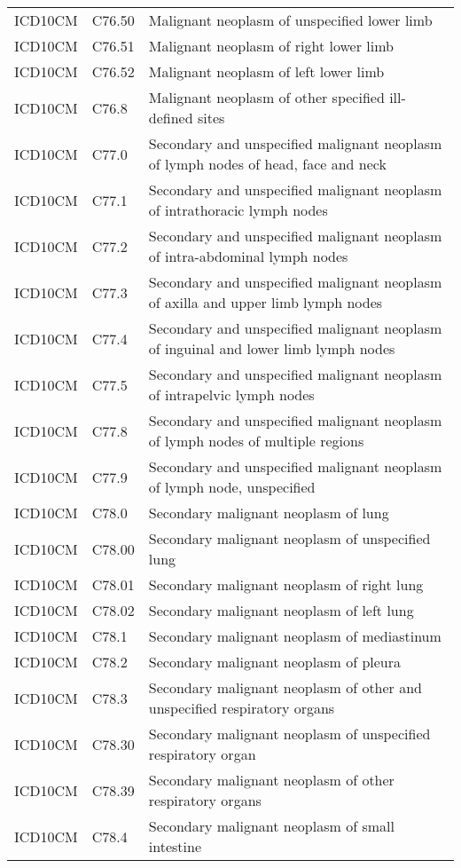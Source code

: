 \begin{table}[ht]
\begin{tabular}{lll}
  ICD10CM & C76.50 & Malignant neoplasm of unspecified lower limb \\ 
  ICD10CM & C76.51 & Malignant neoplasm of right lower limb \\ 
  ICD10CM & C76.52 & Malignant neoplasm of left lower limb \\ 
  ICD10CM & C76.8 & Malignant neoplasm of other specified ill-defined sites \\ 
  ICD10CM & C77.0 & Secondary and unspecified malignant neoplasm of lymph nodes of head, face and neck \\ 
  ICD10CM & C77.1 & Secondary and unspecified malignant neoplasm of intrathoracic lymph nodes \\ 
  ICD10CM & C77.2 & Secondary and unspecified malignant neoplasm of intra-abdominal lymph nodes \\ 
  ICD10CM & C77.3 & Secondary and unspecified malignant neoplasm of axilla and upper limb lymph nodes \\ 
  ICD10CM & C77.4 & Secondary and unspecified malignant neoplasm of inguinal and lower limb lymph nodes \\ 
  ICD10CM & C77.5 & Secondary and unspecified malignant neoplasm of intrapelvic lymph nodes \\ 
  ICD10CM & C77.8 & Secondary and unspecified malignant neoplasm of lymph nodes of multiple regions \\ 
  ICD10CM & C77.9 & Secondary and unspecified malignant neoplasm of lymph node, unspecified \\ 
  ICD10CM & C78.0 & Secondary malignant neoplasm of lung \\ 
  ICD10CM & C78.00 & Secondary malignant neoplasm of unspecified lung \\ 
  ICD10CM & C78.01 & Secondary malignant neoplasm of right lung \\ 
  ICD10CM & C78.02 & Secondary malignant neoplasm of left lung \\ 
  ICD10CM & C78.1 & Secondary malignant neoplasm of mediastinum \\ 
  ICD10CM & C78.2 & Secondary malignant neoplasm of pleura \\ 
  ICD10CM & C78.3 & Secondary malignant neoplasm of other and unspecified respiratory organs \\ 
  ICD10CM & C78.30 & Secondary malignant neoplasm of unspecified respiratory organ \\ 
  ICD10CM & C78.39 & Secondary malignant neoplasm of other respiratory organs \\ 
  ICD10CM & C78.4 & Secondary malignant neoplasm of small intestine \\ 

\end{tabular}
\end{table}
